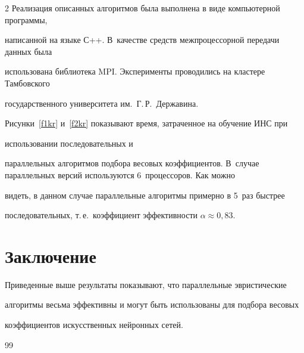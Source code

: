 \begin{multicols}{2}
 Реализация описанных алгоритмов была выполнена в виде компьютерной программы,


написанной на языке С++. В~качестве средств межпроцессорной передачи данных была


использована библио\-те\-ка MPI. Эксперименты проводились на клас\-те\-ре Тамбовского


государственного университета им.~Г.\,Р.~Державина.





 Рисунки~\ref{f1kr} и~\ref{f2kr} показывают время, затраченное на обучение ИНС при


использовании последовательных и


параллельных алгоритмов подбора весовых коэффициентов. В~случае параллельных версий используются 6~процессоров. Как можно


видеть, в данном случае параллельные алгоритмы примерно в 5~раз быстрее


последовательных, т.\,е.\ коэффициент эффективности $\alpha\approx 0{,}83$.








\vspace*{-5pt}


\section{Заключение}





 Приведенные выше результаты показывают, что параллельные эвристические


алгоритмы весьма эффективны и могут быть использованы для подбора весовых


коэффициентов искусственных нейронных сетей.





\vspace*{-9pt}





{\small\frenchspacing


{\baselineskip=10pt




\begin{thebibliography}{99}









\end{thebibliography}}}
\end{multicols}

